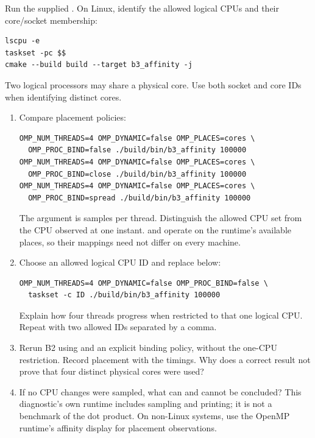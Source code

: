 Run the supplied . On Linux, identify the allowed logical
CPUs and their core/socket membership:
\begin{lstlisting}[style=shell]
lscpu -e
taskset -pc $$
cmake --build build --target b3_affinity -j
\end{lstlisting}
Two logical processors may share a physical core. Use both socket and core IDs
when identifying distinct cores.
\begin{enumerate}
\item Compare placement policies:
\begin{lstlisting}[style=shell]
OMP_NUM_THREADS=4 OMP_DYNAMIC=false OMP_PLACES=cores \
  OMP_PROC_BIND=false ./build/bin/b3_affinity 100000
OMP_NUM_THREADS=4 OMP_DYNAMIC=false OMP_PLACES=cores \
  OMP_PROC_BIND=close ./build/bin/b3_affinity 100000
OMP_NUM_THREADS=4 OMP_DYNAMIC=false OMP_PLACES=cores \
  OMP_PROC_BIND=spread ./build/bin/b3_affinity 100000
\end{lstlisting}
The argument is samples per thread. Distinguish the allowed CPU set from the CPU
observed at one instant. \code{close} and  operate on the runtime's
available places, so their mappings need not differ on every machine.
\item Choose an allowed logical CPU ID and replace \code{ID} below:
\begin{lstlisting}[style=shell]
OMP_NUM_THREADS=4 OMP_DYNAMIC=false OMP_PROC_BIND=false \
  taskset -c ID ./build/bin/b3_affinity 100000
\end{lstlisting}
Explain how four threads progress when restricted to that one logical CPU.
Repeat with two allowed IDs separated by a comma.
\item Rerun B2 using \code{OMP_PLACES=cores} and an explicit binding policy,
without the one-CPU restriction. Record placement with the timings. Why does a
correct result not prove that four distinct physical cores were used?
\item If no CPU changes were sampled, what can and cannot be concluded?
This diagnostic's own runtime includes sampling and printing; it is not a
benchmark of the dot product. On non-Linux systems, use the OpenMP runtime's
affinity display for placement observations.
\end{enumerate}

